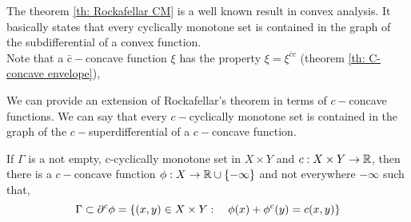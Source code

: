The theorem \ref{th: Rockafellar CM} is a well known result in convex analysis. It basically states that every cyclically monotone set is contained in the graph of the subdifferential of a convex function.\\
Note that a $\bar c-$concave function $\xi$ has the property $\xi=\xi^{\bar c c}$ (theorem \ref{th: C-concave envelope}), 

We can provide an extension of Rockafellar's theorem in terms of $c-$concave functions. We can say that every $c-$cyclically monotone set is contained in the graph of the $c-$superdifferential of a $c-$concave function. 

\begin{theorem}
	If $\Gamma$ is a not empty, c-cyclically monotone set in $X\times Y$ and $c:X\times Y \rightarrow \mathbb{R}$, then there is a $c-$concave function $\phi:X\rightarrow \mathbb{R}\cup\left\lbrace -\infty \right\rbrace$ and not everywhere $-\infty$ such that,
	\begin{equation}
		\Gamma\subset\partial^c\phi=\left\lbrace (x,y)\in X\times Y:\quad \phi(x)+\phi^c(y)=c(x,y) \right\rbrace
	\end{equation}
	\label{th: c-cyclically in superdifferential}
\end{theorem}

